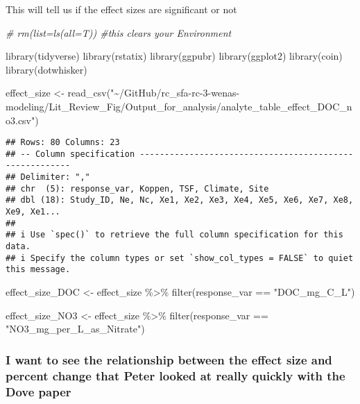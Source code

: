 \documentclass[
]{article}
\newenvironment{Shaded}{\begin{snugshade}}{\end{snugshade}}
\newcommand{\CommentTok}[1]{\textcolor[rgb]{0.56,0.35,0.01}{\textit{#1}}}
\newcommand{\FunctionTok}[1]{\textcolor[rgb]{0.00,0.00,0.00}{#1}}
\newcommand{\NormalTok}[1]{#1}
\newcommand{\OtherTok}[1]{\textcolor[rgb]{0.56,0.35,0.01}{#1}}
\newcommand{\SpecialCharTok}[1]{\textcolor[rgb]{0.00,0.00,0.00}{#1}}
\newcommand{\StringTok}[1]{\textcolor[rgb]{0.31,0.60,0.02}{#1}}
\begin{document}
This will tell us if the effect sizes are significant or not

\begin{Shaded}
\begin{Highlighting}[]
\CommentTok{\# rm(list=ls(all=T)) \#this clears your Environment}


\FunctionTok{library}\NormalTok{(tidyverse)}
\FunctionTok{library}\NormalTok{(rstatix)}
\FunctionTok{library}\NormalTok{(ggpubr)}
\FunctionTok{library}\NormalTok{(ggplot2)}
\FunctionTok{library}\NormalTok{(coin)}
\FunctionTok{library}\NormalTok{(dotwhisker)}

\NormalTok{effect\_size }\OtherTok{\textless{}{-}} \FunctionTok{read\_csv}\NormalTok{(}\StringTok{"\textasciitilde{}/GitHub/rc\_sfa{-}rc{-}3{-}wenas{-}modeling/Lit\_Review\_Fig/Output\_for\_analysis/analyte\_table\_effect\_DOC\_no3.csv"}\NormalTok{)}
\end{Highlighting}
\end{Shaded}

\begin{verbatim}
## Rows: 80 Columns: 23
## -- Column specification --------------------------------------------------------
## Delimiter: ","
## chr  (5): response_var, Koppen, TSF, Climate, Site
## dbl (18): Study_ID, Ne, Nc, Xe1, Xe2, Xe3, Xe4, Xe5, Xe6, Xe7, Xe8, Xe9, Xe1...
## 
## i Use `spec()` to retrieve the full column specification for this data.
## i Specify the column types or set `show_col_types = FALSE` to quiet this message.
\end{verbatim}

\begin{Shaded}
\begin{Highlighting}[]
\NormalTok{effect\_size\_DOC }\OtherTok{\textless{}{-}}\NormalTok{ effect\_size }\SpecialCharTok{\%\textgreater{}\%} 
  \FunctionTok{filter}\NormalTok{(response\_var }\SpecialCharTok{==} \StringTok{"DOC\_mg\_C\_L"}\NormalTok{)}

\NormalTok{effect\_size\_NO3 }\OtherTok{\textless{}{-}}\NormalTok{ effect\_size }\SpecialCharTok{\%\textgreater{}\%} 
  \FunctionTok{filter}\NormalTok{(response\_var }\SpecialCharTok{==} \StringTok{"NO3\_mg\_per\_L\_as\_Nitrate"}\NormalTok{)}
\end{Highlighting}
\end{Shaded}

\hypertarget{i-want-to-see-the-relationship-between-the-effect-size-and-percent-change-that-peter-looked-at-really-quickly-with-the-dove-paper}{%
\subsubsection{I want to see the relationship between the effect size
and percent change that Peter looked at really quickly with the Dove
paper}\label{i-want-to-see-the-relationship-between-the-effect-size-and-percent-change-that-peter-looked-at-really-quickly-with-the-dove-paper}}
\end{document}
